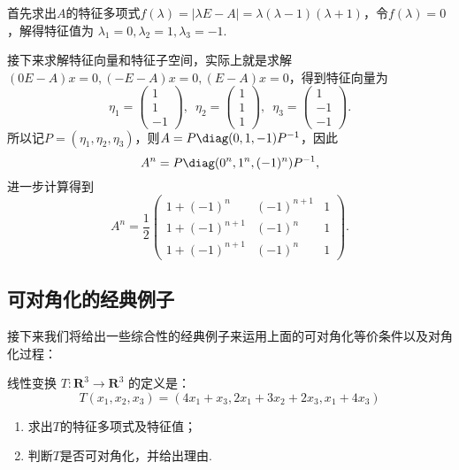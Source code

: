 \begin{solution}
    首先求出$A$的特征多项式$f(\lambda)=|\lambda E-A|=\lambda(\lambda-1)(\lambda+1)$，令$f(\lambda)=0$，解得特征值为 $\lambda_1=0,\lambda_2=1,\lambda_3=-1$.

    接下来求解特征向量和特征子空间，实际上就是求解$(0E-A)x=0,(-E-A)x=0,(E-A)x=0$，得到特征向量为
    \[\eta_1=\begin{pmatrix}
            1 \\ 1 \\ -1
        \end{pmatrix},\enspace \eta_2=\begin{pmatrix}
            1 \\ 1 \\ 1
        \end{pmatrix},\enspace \eta_3=\begin{pmatrix}
            1 \\ -1 \\ -1
        \end{pmatrix}.\]
    所以记$P=(\eta_1,\eta_2,\eta_3)$，则$A=P\diag(0,1,-1)P^{-1}$，因此
    \[A^n=P\diag(0^n,1^n,(-1)^n)P^{-1},\]
    进一步计算得到
    \[A^n=\frac{1}{2}\begin{pmatrix}
            1+(-1)^n     & (-1)^{n+1} & 1 \\
            1+(-1)^{n+1} & (-1)^n     & 1 \\
            1+(-1)^{n+1} & (-1)^n     & 1
        \end{pmatrix}.\]
\end{solution}

\subsection{可对角化的经典例子}

接下来我们将给出一些综合性的经典例子来运用上面的可对角化等价条件以及对角化过程：
\begin{example}{}{}
    线性变换 $T : \mathbf{R}^3 \to \mathbf{R}^3$ 的定义是：
    \[T(x_1,x_2,x_3)=(4x_1+x_3,2x_1+3x_2+2x_3,x_1+4x_3)\]
    \begin{enumerate}
        \item 求出$T$的特征多项式及特征值；

        \item 判断$T$是否可对角化，并给出理由.
    \end{enumerate}
\end{example}

